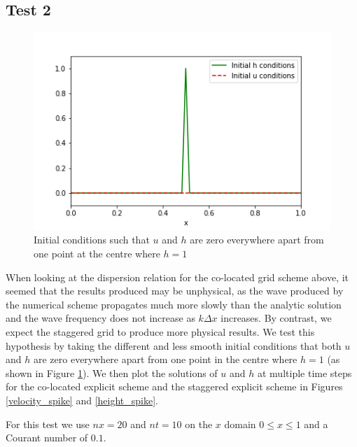 \documentclass[a4paper, 10.5pt, notitlepage]{article}
\begin{document}
\subsection{Test 2}
\begin{figure}[H]
\begin{center}
\begin{minipage}{.5\textwidth}
	\centering
	\captionsetup{width=2\textwidth}
	\captionsetup{justification=centering}
	\includegraphics[width=\textwidth]{initial_condition_spike.png}
	\caption{\label{initialconditionspike}Initial conditions such that $u$ and $h$ are zero everywhere apart from one point at the centre where $h = 1$} 
\end{minipage}
\end{center}
\end{figure}

When looking at the dispersion relation for the co-located grid scheme above, it seemed that the results produced may be unphysical, as the wave produced by the numerical scheme propagates much more slowly than the analytic solution and the wave frequency does not increase as $k\Delta x$ increases. By contrast, we expect the staggered grid to produce more physical results. We test this hypothesis by taking the different and less smooth initial conditions that both $u$ and $h$ are zero everywhere apart from one point in the centre where $h = 1$ (as shown in Figure \ref{initialconditionspike}). We then plot the solutions of $u$ and $h$ at multiple time steps for the co-located explicit scheme and the staggered explicit scheme in Figures \ref{velocity_spike} and \ref{height_spike}.

For this test we use $nx = 20$ and $nt = 10$ on the $x$ domain $0 \leq x \leq 1$ and a Courant number of $0.1$.
\end{document}
